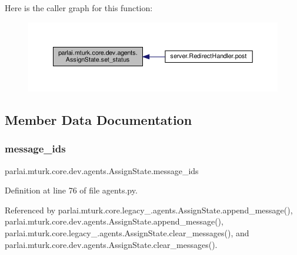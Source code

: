 Here is the caller graph for this function\+:
\nopagebreak
\begin{figure}[H]
\begin{center}
\leavevmode
\includegraphics[width=350pt]{classparlai_1_1mturk_1_1core_1_1dev_1_1agents_1_1AssignState_a8a4989ac979fca506d8249d3a749ca0c_icgraph}
\end{center}
\end{figure}


\subsection{Member Data Documentation}
\mbox{\label{classparlai_1_1mturk_1_1core_1_1dev_1_1agents_1_1AssignState_ac261cbc1fe018a16b1b46365a86d48ed}} 
\subsubsection{\texorpdfstring{message\+\_\+ids}{message\_ids}}
{\footnotesize\ttfamily parlai.\+mturk.\+core.\+dev.\+agents.\+Assign\+State.\+message\+\_\+ids}



Definition at line 76 of file agents.\+py.



Referenced by parlai.\+mturk.\+core.\+legacy\+\_.\+agents.\+Assign\+State.\+append\+\_\+message(), parlai.\+mturk.\+core.\+dev.\+agents.\+Assign\+State.\+append\+\_\+message(), parlai.\+mturk.\+core.\+legacy\+\_.\+agents.\+Assign\+State.\+clear\+\_\+messages(), and parlai.\+mturk.\+core.\+dev.\+agents.\+Assign\+State.\+clear\+\_\+messages().

\mbox{\label{classparlai_1_1mturk_1_1core_1_1dev_1_1agents_1_1AssignState_a95a4aae763453988405c9bf10977e35f}} 

